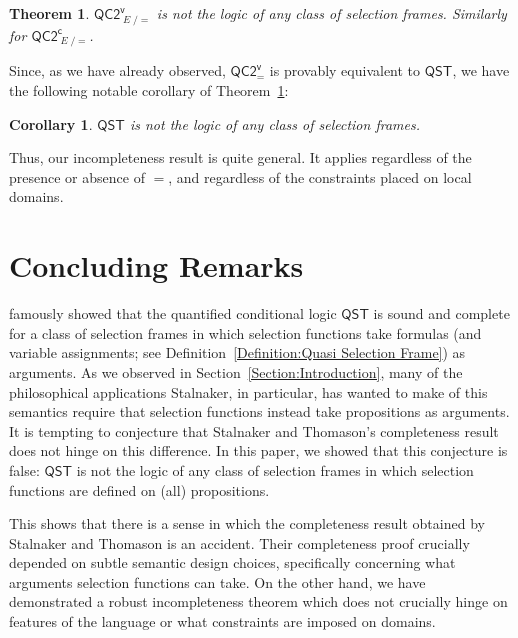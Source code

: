 \documentclass[12pt]{article}
\newtheorem{theorem}{Theorem}
\newtheorem{corollary}{Corollary}
\newcommand{\ex}{\mathop{\textit{E}}}
\begin{document}
\begin{theorem}
\label{thm:QC2v-incomp}
    $\mathsf{QC2^v_{\ex/=}}$ is not the logic of any class of selection frames. 
    Similarly for $\mathsf{QC2^c_{\ex/=}}$. 
\end{theorem}


Since, as we have already observed, $\mathsf{QC2^v_{=}}$ is provably equivalent to $\mathsf{QST}$, we have the following notable corollary of Theorem~\ref{thm:QC2v-incomp}:

\begin{corollary}
\label{Corollary:QST}
    $\mathsf{QST}$ is not the logic of any class of selection frames. 
\end{corollary}

\noindent Thus, our incompleteness result is quite general. It applies regardless of the presence or absence of $=$, and regardless of the constraints placed on local domains. 


\section{Concluding Remarks}
\label{Section:Concluding Remarks}


\cite{StalnakerThomason1970} famously showed that the quantified conditional logic $\mathsf{QST}$ is sound and complete for a class of selection frames in which selection functions take formulas (and variable assignments; see Definition~\ref{Definition:Quasi Selection Frame}) as arguments. 
As we observed in Section~\ref{Section:Introduction}, many of the philosophical applications Stalnaker, in particular, has wanted to make of this semantics require that selection functions instead take propositions as arguments. 
It is tempting to conjecture that Stalnaker and Thomason's completeness result does not hinge on this difference. 
In this paper, we showed that this conjecture is false: $\mathsf{QST}$ is not the logic of any class of selection frames in which selection functions are defined on (all) propositions. 

This shows that there is a sense in which the completeness result obtained by Stalnaker and Thomason is an accident. 
Their completeness proof crucially depended on subtle semantic design choices, specifically concerning what arguments selection functions can take. 
On the other hand, we have demonstrated a robust incompleteness theorem which does not crucially hinge on features of the language or what constraints are imposed on domains. 
\end{document}
